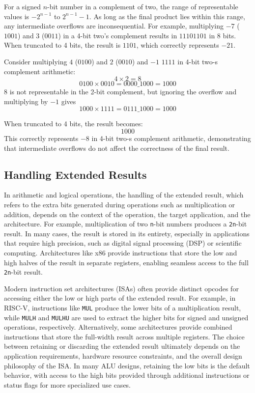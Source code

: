 For a signed \(n\)-bit number in a complement of two, the range of representable values is \(-2^{n-1}\) to \(2^{n-1} - 1\). As long as the final product lies within this range, any intermediate overflows are inconsequential. For example, multiplying \(-7\) (\(1001\)) and \(3\) (\(0011\)) in a 4-bit two's complement results in \(11101101\) in 8 bits. When truncated to 4 bits, the result is \(1101\), which correctly represents \(-21\).

Consider multiplying \(4\) (\(0100\)) and \(2\) (\(0010\)) and \(-1\) \(1111\) in 4-bit two-s complement arithmetic:
\[
4 \times 2 = 8
\]
\[
0100 \times 0010 = 0000\_1000 = 1000
\]
8 is not representable in the 2-bit complement, but ignoring the overflow and multiplying by $-1$ gives
\[
1000 \times 1111 = 0111\_1000 = 1000
\]

When truncated to 4 bits, the result becomes:
\[
1000
\]
This correctly represents \(-8\) in 4-bit two-s complement arithmetic, demonstrating that intermediate overflows do not affect the correctness of the final result.

\subsection{Handling Extended Results}

In arithmetic and logical operations, the handling of the extended result, which refers to the extra bits generated during operations such as multiplication or addition, depends on the context of the operation, the target application, and the architecture. For example, multiplication of two \texttt{n}-bit numbers produces a \texttt{2n}-bit result. In many cases, the result is stored in its entirety, especially in applications that require high precision, such as digital signal processing (DSP) or scientific computing. Architectures like x86 provide instructions that store the low and high halves of the result in separate registers, enabling seamless access to the full \texttt{2n}-bit result.

Modern instruction set architectures (ISAs) often provide distinct opcodes for accessing either the low or high parts of the extended result. For example, in RISC-V, instructions like \texttt{MUL} produce the lower bits of a multiplication result, while \texttt{MULH} and \texttt{MULHU} are used to extract the higher bits for signed and unsigned operations, respectively. Alternatively, some architectures provide combined instructions that store the full-width result across multiple registers. The choice between retaining or discarding the extended result ultimately depends on the application requirements, hardware resource constraints, and the overall design philosophy of the ISA. In many ALU designs, retaining the low bits is the default behavior, with access to the high bits provided through additional instructions or status flags for more specialized use cases.

